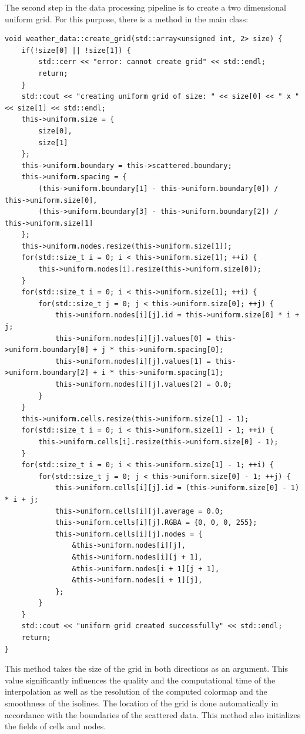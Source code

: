 \documentclass[a4paper, 10pt]{article}
\begin{document}
The second step in the data processing pipeline is to create a two dimensional uniform grid. For this purpose, there is a method in the main class:
\begin{lstlisting}[caption= method for creating uniform grid]
void weather_data::create_grid(std::array<unsigned int, 2> size) {
	if(!size[0] || !size[1]) {
		std::cerr << "error: cannot create grid" << std::endl;
		return;
	}
	std::cout << "creating uniform grid of size: " << size[0] << " x " << size[1] << std::endl;
	this->uniform.size = {
		size[0],
		size[1]
	};
	this->uniform.boundary = this->scattered.boundary;
	this->uniform.spacing = {
		(this->uniform.boundary[1] - this->uniform.boundary[0]) / this->uniform.size[0],
		(this->uniform.boundary[3] - this->uniform.boundary[2]) / this->uniform.size[1]
	};
	this->uniform.nodes.resize(this->uniform.size[1]);
	for(std::size_t i = 0; i < this->uniform.size[1]; ++i) {
		this->uniform.nodes[i].resize(this->uniform.size[0]);
	}
	for(std::size_t i = 0; i < this->uniform.size[1]; ++i) {
		for(std::size_t j = 0; j < this->uniform.size[0]; ++j) {
			this->uniform.nodes[i][j].id = this->uniform.size[0] * i + j;
			this->uniform.nodes[i][j].values[0] = this->uniform.boundary[0] + j * this->uniform.spacing[0];
			this->uniform.nodes[i][j].values[1] = this->uniform.boundary[2] + i * this->uniform.spacing[1];
			this->uniform.nodes[i][j].values[2] = 0.0;
		}
	}
	this->uniform.cells.resize(this->uniform.size[1] - 1);
	for(std::size_t i = 0; i < this->uniform.size[1] - 1; ++i) {
		this->uniform.cells[i].resize(this->uniform.size[0] - 1);
	}
	for(std::size_t i = 0; i < this->uniform.size[1] - 1; ++i) {
		for(std::size_t j = 0; j < this->uniform.size[0] - 1; ++j) {
			this->uniform.cells[i][j].id = (this->uniform.size[0] - 1) * i + j;
			this->uniform.cells[i][j].average = 0.0;
			this->uniform.cells[i][j].RGBA = {0, 0, 0, 255};
			this->uniform.cells[i][j].nodes = {
				&this->uniform.nodes[i][j],
				&this->uniform.nodes[i][j + 1],
				&this->uniform.nodes[i + 1][j + 1],
				&this->uniform.nodes[i + 1][j],
			};
		}
	}
	std::cout << "uniform grid created successfully" << std::endl;
	return;
}
\end{lstlisting}
This method takes the size of the grid in both directions as an argument. This value significantly influences the quality and the computational time of the interpolation as well as the resolution of the computed colormap and the smoothness of the isolines. The location of the grid is done automatically in accordance with the boundaries of the scattered data. This method also initializes the fields of cells and nodes.
\end{document}
